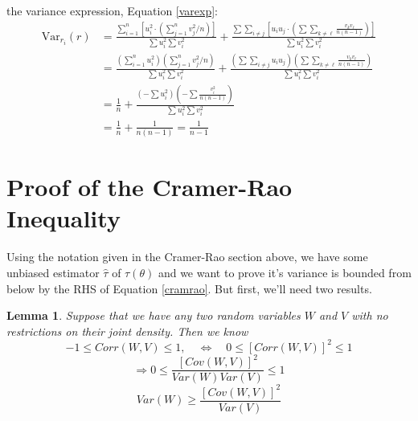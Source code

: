\documentclass[a4paper,12pt]{scrartcl}
\newtheorem{lem}[thm]{Lemma}
\begin{document}
\begin{itemize}
      the variance expression, Equation \ref{varexp}:
      \begin{align*}
	 \text{Var}_{r_i}(r) &= \frac{\sum_{i=1}^n \left[u^2_i \cdot
	    \left( \sum^n_{j=1} v^2_j/n\right)\right]
	    }{
	    \sum u^2_i \sum v^2_i} +
	  \frac{\sum \sum_{i\neq j} \left[u_i u_j\cdot
	    \left( \sum \sum_{k\neq \ell} \frac{
	       v_k v_\ell}{n(n-1)}
	     \right)\right]
       }{\sum u^2_i \sum v^2_i} \\
       &= \frac{\left(\sum_{i=1}^n u^2_i\right)\left(
	    \sum^n_{j=1} v^2_j/n  \right)
	    }{
	    \sum u^2_i \sum v^2_i} +
	  \frac{\left(\sum \sum_{i\neq j} u_i u_j \right)
	    \left( \sum \sum_{k\neq \ell} \frac{
	       v_k v_\ell}{n(n-1)}\right)
	  }{\sum u^2_i \sum v^2_i} \\
      &= \frac{1}{n} + \frac{\left(-\sum u^2_i\right)\left(
	 -\sum \frac{v^2_i}{n(n-1)}\right)}{
	 \sum u^2_i \sum v^2_i} \\
      &= \frac{1}{n} + \frac{1}{n(n-1)} = \frac{1}{n-1}
      \end{align*}



\end{itemize}



\newpage

\appendix

\section{Proof of the Cramer-Rao Inequality}

Using the notation given in the Cramer-Rao section above,
we have some unbiased estimator $\hat{\tau}$ of $\tau(\theta)$ and
we want to prove it's variance is bounded from below by the RHS of
Equation \ref{cramrao}. But first, we'll need two results.

\begin{lem} Suppose that we have any two random variables $W$ and
   $V$ with no restrictions on their joint density. Then we know
      \[ -1 \leq Corr(W,V) \leq 1, \quad \Leftrightarrow \quad
	 0 \leq [Corr(W,V)]^2 \leq 1 \]
      \[ \Rightarrow 0 \leq \frac{[Cov(W,V)]^2}{Var(W) Var(V)} \leq 1 \]
      \begin{equation}
	 \label{a1}
	 Var(W) \geq \frac{[Cov(W,V)]^2}{Var(V)}
      \end{equation}
\end{lem}
\end{document}

